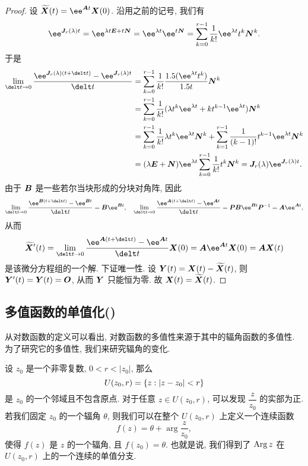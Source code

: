 \begin{proof}
  设 $\wt\bfX(t)=\ee^{\bfA t}\bfX(0)$.
  沿用之前的记号, 我们有
  \[
     \ee^{\bfJ_r(\lambda)t}
    =\ee^{\lambda t\bfE+t\bfN}
    =\ee^{\lambda t}\ee^{t\bfN}
    =\sum_{k=0}^{r-1}\frac1{k!}\ee^{\lambda t}t^k\bfN^k.
  \]
  于是
  \begin{align*}
     \lim_{\delt t\ra 0}\frac{\ee^{\bfJ_r(\lambda)(t+\delt t)}-\ee^{\bfJ_r(\lambda)t}}{\delt t}&
    =\sum_{k=0}^{r-1}\frac1{k!}\frac{\d(\ee^{\lambda t}t^k)}{\d t}\bfN^k\\&
    =\sum_{k=0}^{r-1}\frac1{k!}(\lambda t^k\ee^{\lambda t}+kt^{k-1}\ee^{\lambda t})\bfN^k\\&
    =\sum_{k=0}^{r-1}\frac1{k!}\lambda t^k\ee^{\lambda t}\bfN^k+\sum_{k=1}^{r-1}\frac1{(k-1)!}t^{k-1}\ee^{\lambda t}\bfN^k\\&
    =(\lambda\bfE+\bfN)\ee^{\lambda t}\sum_{k=0}^{r-1}\frac1{k!}t^k\bfN^k
    =\bfJ_r(\lambda)\ee^{\bfJ_r(\lambda)t}.
  \end{align*}
  由于 ${\boldsymbol{B}}$ 是一些若尔当块形成的分块对角阵, 因此
  \[
     \lim_{\delt t\ra 0}\frac{\ee^{\bfB(t+\delt t)}-\ee^{\bfB t}}{\delt t}
    =\bfB\ee^{\bfB t},\quad
     \lim_{\delt t\ra 0}\frac{\ee^{\bfA(t+\delt t)}-\ee^{\bfA t}}{\delt t}
    =\bfP\bfB\ee^{\bfB t}\bfP^{-1}
    =\bfA\ee^{\bfA t},
  \]
  从而
  \[
     \wt\bfX'(t)
    =\lim_{\delt t\ra 0}\frac{\ee^{\bfA(t+\delt t)}-\ee^{\bfA t}}{\delt t}\bfX(0)
    =\bfA\ee^{\bfA t}\bfX(0)
    =\bfA\bfX(t)
  \]
  是该微分方程组的一个解.
  下证唯一性.
  设 ${\boldsymbol{Y}}(t)={\boldsymbol{X}}(t)-\widetilde{{\boldsymbol{X}}}(t)$, 则 ${\boldsymbol{Y}}'(t)={\boldsymbol{Y}}(t)={\boldsymbol{O}}$, 从而 ${\boldsymbol{Y}}$ 只能恒为零.
  故 ${\boldsymbol{X}}(t)=\widetilde{{\boldsymbol{X}}}(t)$.
\end{proof}



\subsection{多值函数的单值化(\optional)}

从对数函数的定义可以看出, 对数函数的多值性来源于其中的辐角函数的多值性.
为了研究它的多值性, 我们来研究辐角的变化.

设 $z_0$ 是一个非零复数, $0<r<|z_0|$, 那么
\[
  U(z_0,r)={\left\{z:|z-z_0|<r\right\}}
\]
是 $z_0$ 的一个邻域且不包含原点.
对于任意 $z\in U(z_0,r)$, 可以发现 $\dfrac z{z_0}$ 的实部为正.
若我们固定 $z_0$ 的一个辐角 $\theta$, 则我们可以在整个 $U(z_0,r)$ 上定义一个连续函数
\[
  f(z)=\theta+\arg\frac z{z_0},
\]
使得 $f(z)$ 是 $z$ 的一个辐角, 且 $f(z_0)=\theta$.
也就是说, 我们得到了 $\operatorname{Arg} z$ 在 $U(z_0,r)$ 上的一个连续的单值分支.

